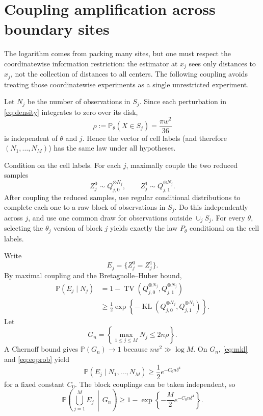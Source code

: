 \documentclass[11pt]{article}
\newcommand{\Pp}{\mathbb P}
\newcommand{\TV}{\operatorname{TV}}
\newcommand{\KL}{\operatorname{KL}}
\newcommand{\1}{\mathbf 1}
\begin{document}
\section{Coupling amplification across boundary sites}

The logarithm comes from packing many sites, but one must respect the coordinatewise information restriction: the estimator at $x_j$ sees only distances to $x_j$, not the collection of distances to all centers.  The following coupling avoids treating those coordinatewise experiments as a single unrestricted experiment.

Let $N_j$ be the number of observations in $S_j$.  Since each perturbation in \eqref{eq:density} integrates to zero over its disk,
\[
\rho:=\Pp_\theta(X\in S_j)=\frac{\pi w^2}{36}
\]
is independent of $\theta$ and $j$.  Hence the vector of cell labels (and therefore $(N_1,\ldots,N_M)$) has the same law under all hypotheses.

Condition on the cell labels.  For each $j$, maximally couple the two reduced samples
\[
Z_j^0\sim Q_{j,0}^{\otimes N_j},
\qquad
Z_j^1\sim Q_{j,1}^{\otimes N_j}.
\]
After coupling the reduced samples, use regular conditional distributions to complete each one to a raw block of observations in $S_j$.  Do this independently across $j$, and use one common draw for observations outside $\cup_jS_j$.  For every $\theta$, selecting the $\theta_j$ version of block $j$ yields exactly the law $P_\theta$ conditional on the cell labels.

Write
\[
E_j=\{Z_j^0=Z_j^1\}.
\]
By maximal coupling and the Bretagnolle--Huber bound,
\begin{align}
\Pp(E_j\mid N_j)
&=1-\TV(Q_{j,0}^{\otimes N_j},Q_{j,1}^{\otimes N_j})\\
&\ge \frac12
\exp\left\{-\KL(Q_{j,0}^{\otimes N_j},Q_{j,1}^{\otimes N_j})\right\}.       \label{eq:eqprob}
\end{align}
Let
\[
G_n=\left\{\max_{1\le j\le M}N_j\le2n\rho\right\}.
\]
A Chernoff bound gives $\Pp(G_n)\to1$ because $nw^2\gg\log M$.  On $G_n$, \eqref{eq:mkl} and \eqref{eq:eqprob} yield
\begin{equation}
\Pp(E_j\mid N_1,\ldots,N_M)
\ge \frac12 e^{-C_0n\delta^4}                                \label{eq:eqprob2}
\end{equation}
for a fixed constant $C_0$.  The block couplings can be taken independent, so
\begin{equation}
\Pp\left(\bigcup_{j=1}^M E_j\,\middle|\,G_n\right)
\ge
1-\exp\left\{-\frac{M}{2}e^{-C_0n\delta^4}\right\}.          \label{eq:anymatch}
\end{equation}
\end{document}
